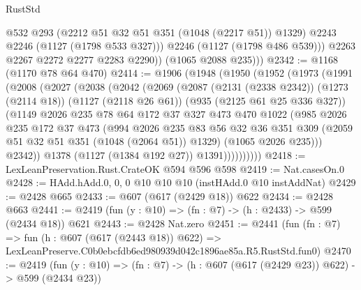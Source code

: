 \begin{lexlean}{RustStd}
\begin{coremodule}
                @532
                @293
                (@2212 @51 @32 @51 @351 (@1048 (@2217 @51)) @1329)
                @2243
                @2246
                (@1127 (@1798 @533 @327)))
              @2246
              (@1127 (@1798 @486 @539)))
            @2263
            @2267
            @2272
            @2277
            @2283
            @2290))
        (@1065 @2088 @235)))
@2342 := @1168 (@1170 @78 @64 @470)
@2414 := @1906
    (@1948
      (@1950
        (@1952
          (@1973
            (@1991
              (@2008
                (@2027
                  (@2038
                    (@2042
                      (@2069
                        (@2087
                          (@2131 (@2338 @2342))
                          (@1273 (@2114 @18))
                          (@1127 (@2118 @26 @61))
                          (@935 (@2125 @61 @25 @336 @327))
                          (@1149
                            @2026
                            @235
                            @78
                            @64
                            @172
                            @37
                            @327
                            @473
                            @470
                            @1022
                            (@985
                              @2026
                              @235
                              @172
                              @37
                              @473
                              (@994
                                @2026
                                @235
                                @83
                                @56
                                @32
                                @36
                                @351
                                @309
                                (@2059 @51 @32 @51 @351 (@1048 (@2064 @51)) @1329)
                                (@1065 @2026 @235)))
                            @2342))
                        @1378
                        (@1127 (@1384 @192 @27))
                        @1391))))))))))
@2418 := LexLeanPreservation.Rust.CrateOK @594 @596 @598
@2419 := Nat.casesOn.{0}
@2428 := HAdd.hAdd.{0, 0, 0} @10 @10 @10 (instHAdd.{0} @10 instAddNat)
@2429 := @2428 @665
@2433 := @607 (@617 (@2429 @18)) @622
@2434 := @2428 @663
@2441 := @2419 (fun (y : @10) => (fn : @7) -> (h : @2433) -> @599 (@2434 @18)) @621
@2443 := @2428 Nat.zero
@2451 := @2441
    (fun (fn : @7) =>
    fun (h : @607 (@617 (@2443 @18)) @622) =>
    LexLeanPreserve.C0b0ebcfdb6ed980939d042c1896ae85a.R5.RustStd.fun0)
@2470 := @2419
    (fun (y : @10) => (fn : @7) -> (h : @607 (@617 (@2429 @23)) @622) -> @599 (@2434 @23))

\end{coremodule}
\end{lexlean}
